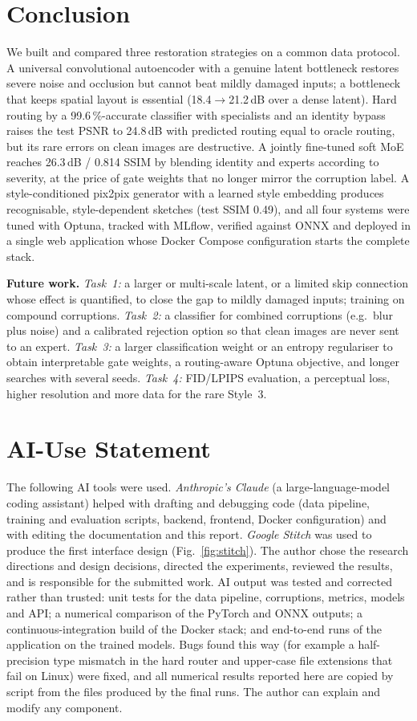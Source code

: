 \section{Conclusion}
We built and compared three restoration strategies on a common data protocol. A universal convolutional autoencoder with a genuine latent bottleneck restores severe noise and occlusion but cannot beat mildly damaged inputs; a bottleneck that keeps spatial layout is essential (18.4$\to$21.2\,dB over a dense latent). Hard routing by a 99.6\,\%-accurate classifier with specialists and an identity bypass raises the test PSNR to 24.8\,dB with predicted routing equal to oracle routing, but its rare errors on clean images are destructive. A jointly fine-tuned soft MoE reaches 26.3\,dB / 0.814 SSIM by blending identity and experts according to severity, at the price of gate weights that no longer mirror the corruption label. A style-conditioned pix2pix generator with a learned style embedding produces recognisable, style-dependent sketches (test SSIM 0.49), and all four systems were tuned with Optuna, tracked with MLflow, verified against ONNX and deployed in a single web application whose Docker Compose configuration starts the complete stack.

\textbf{Future work.} \emph{Task~1:} a larger or multi-scale latent, or a limited skip connection whose effect is quantified, to close the gap to mildly damaged inputs; training on compound corruptions. \emph{Task~2:} a classifier for combined corruptions (e.g.\ blur plus noise) and a calibrated rejection option so that clean images are never sent to an expert. \emph{Task~3:} a larger classification weight or an entropy regulariser to obtain interpretable gate weights, a routing-aware Optuna objective, and longer searches with several seeds. \emph{Task~4:} FID/LPIPS evaluation, a perceptual loss, higher resolution and more data for the rare Style~3.

\appendices
\section{AI-Use Statement}
The following AI tools were used. \emph{Anthropic's Claude} (a large-language-model coding assistant) helped with drafting and debugging code (data pipeline, training and evaluation scripts, backend, frontend, Docker configuration) and with editing the documentation and this report. \emph{Google Stitch} was used to produce the first interface design (Fig.~\ref{fig:stitch}). The author chose the research directions and design decisions, directed the experiments, reviewed the results, and is responsible for the submitted work. AI output was tested and corrected rather than trusted: unit tests for the data pipeline, corruptions, metrics, models and API; a numerical comparison of the PyTorch and ONNX outputs; a continuous-integration build of the Docker stack; and end-to-end runs of the application on the trained models. Bugs found this way (for example a half-precision type mismatch in the hard router and upper-case file extensions that fail on Linux) were fixed, and all numerical results reported here are copied by script from the files produced by the final runs. The author can explain and modify any component.

